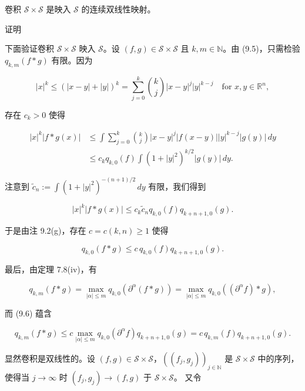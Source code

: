 \begin{proposition}

卷积 $ \mathcal{S}\times\mathcal{S} $ 是映入 $ \mathcal{S} $ 的连续双线性映射。

证明

\begin{subitems}
\item

下面验证卷积 $ \mathcal{S}\times\mathcal{S} $ 映入 $ \mathcal{S} $。设 $ (f,g) \in \mathcal{S}\times\mathcal{S} $ 且 $ k,m \in \mathbb{N} $。由 (9.5)，只需检验 $ q_{k,m}(f*g) $ 有限。因为

\[
|x|^k \le (|x-y|+|y|)^k = \sum_{j=0}^{k}\binom{k}{j}|x-y|^j|y|^{k-j} \quad \text{for } x,y \in \mathbb{R}^n ,
\]

存在 $ c_k > 0 $ 使得

\begin{equation*}
\begin{aligned}
|x|^k|f*g(x)| &\le \int\sum_{j=0}^{k}\binom{k}{j}|x-y|^j|f(x-y)||y|^{k-j}|g(y)|\,dy \\ &\le c_k q_{k,0}(f)\int(1+|y|^2)^{k/2}|g(y)|\,dy .
\end{aligned}
\end{equation*}

注意到 $ \widetilde{c}_n := \int(1+|y|^2)^{-(n+1)/2}\,dy $ 有限，我们得到

\[
|x|^k|f*g(x)| \le c_k\widetilde{c}_n q_{k,0}(f)q_{k+n+1,0}(g) .
\]

于是由注 9.2(g)，存在 $ c = c(k,n) \ge 1 $ 使得

\begin{equation}
q_{k,0}(f*g) \le c\,q_{k,0}(f)q_{k+n+1,0}(g) .\tag{9.6}
\end{equation}

最后，由定理 7.8(iv)，有

\[
q_{k,m}(f*g) = \max_{|\alpha| \le m}q_{k,0}(\partial^{\alpha}(f*g)) = \max_{|\alpha| \le m}q_{k,0}((\partial^{\alpha}f)*g) ,
\]

而 (9.6) 蕴含

\begin{equation}
q_{k,m}(f*g) \le c\max_{|\alpha| \le m}q_{k,0}(\partial^{\alpha}f)q_{k+n+1,0}(g) = c\,q_{k,m}(f)q_{k+n+1,0}(g) .\tag{9.7}
\end{equation}
\item

显然卷积是双线性的。设 $ (f,g) \in \mathcal{S}\times\mathcal{S} $，$ ((f_j,g_j))_{j \in \mathbb{N}} $ 是 $ \mathcal{S}\times\mathcal{S} $ 中的序列，使得当 $ j \to \infty $ 时 $ (f_j,g_j) \to (f,g) $ 于 $ \mathcal{S}\times\mathcal{S} $。
又令


\end{subitems}
\end{proposition}
